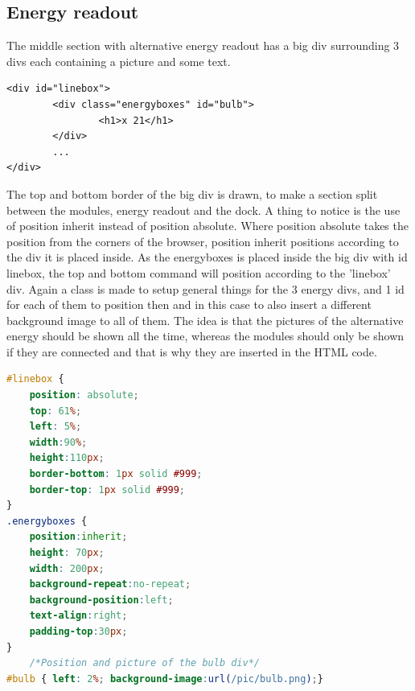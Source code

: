 \subsection{Energy readout}
The middle section with alternative energy readout has a big div surrounding 3 divs each containing a picture and some text.
\begin{lstlisting}
<div id="linebox">
		<div class="energyboxes" id="bulb">
				<h1>x 21</h1>
		</div>
		...
</div>
\end{lstlisting}
The top and bottom border of the big div is drawn, to make a section split between the modules, energy readout and the dock. A thing to notice is the use of position inherit instead of position absolute. Where position absolute takes the position from the corners of the browser, position inherit positions according to the div it is placed inside. As the energyboxes is placed inside the big div with id linebox, the top and bottom command will position according to the 'linebox' div. Again a class is made to setup general things for the 3 energy divs, and 1 id for each of them to position then and in this case to also insert a different background image to all of them. The idea is that the pictures of the alternative energy should be shown all the time, whereas the modules should only be shown if they are connected and that is why they are inserted in the HTML code.
\begin{lstlisting}[language=CSS]
#linebox {
	position: absolute;
	top: 61%;
	left: 5%;
	width:90%;
	height:110px;
	border-bottom: 1px solid #999;
	border-top: 1px solid #999;
}
.energyboxes {
	position:inherit;
	height: 70px;
	width: 200px;
	background-repeat:no-repeat;
	background-position:left;
	text-align:right;
	padding-top:30px;
}
	/*Position and picture of the bulb div*/
#bulb { left: 2%; background-image:url(/pic/bulb.png);}
\end{lstlisting}


